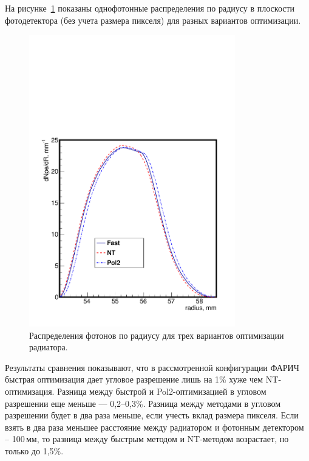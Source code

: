 \documentclass[12pt]{article}
\begin{document}
На рисунке~\ref{fig:methcomp} показаны однофотонные распределения по радиусу в плоскости фотодетектора (без учета размера пикселя) 
для разных вариантов оптимизации. 
\begin{figure}[htbp]
\begin{center}
\includegraphics[width=0.8\textwidth]{hrad_mla4_varopt.pdf}
\caption{Распределения фотонов по радиусу для трех вариантов оптимизации радиатора.}
\label{fig:methcomp}
\end{center}
\end{figure}

Результаты сравнения показывают, что в рассмотренной конфигурации ФАРИЧ быстрая оптимизация дает угловое разрешение лишь на 1\% хуже чем NT-оптимизация. 
Разница между быстрой и Pol2-оптимизацией в угловом разрешении еще меньше --- 0,2--0,3\%. Разница между методами в угловом разрешении будет в два 
раза меньше, если учесть вклад размера пикселя. Если взять в два раза меньшее расстояние между радиатором и фотонным детектором -- 100\,мм, 
то разница между быстрым методом и NT-методом возрастает, но только до 1,5\%.
\end{document}
